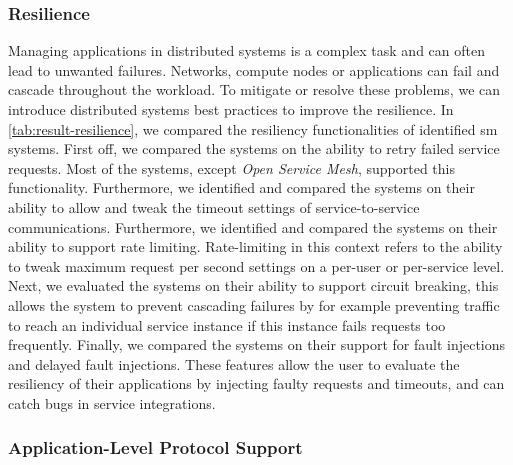 \subsubsection{Resilience}
\label{sec:survey:results:comparison:resilience}




Managing applications in distributed systems is a complex task and can often lead to unwanted failures. Networks, compute nodes or applications can fail and cascade throughout the workload. To mitigate or resolve these problems, we can introduce distributed systems best practices to improve the resilience. In \cref{tab:result-resilience}, we compared the resiliency functionalities of identified \gls{sm} systems. First off, we compared the systems on the ability to retry failed service requests. Most of the systems, except \textit{Open Service Mesh}, supported this functionality. Furthermore, we identified and compared the systems on their ability to allow and tweak the timeout settings of service-to-service communications. Furthermore, we identified and compared the systems on their ability to support rate limiting. Rate-limiting in this context refers to the ability to tweak maximum request per second settings on a per-user or per-service level. Next, we evaluated the systems on their ability to support circuit breaking, this allows the system to prevent cascading failures by for example preventing traffic to reach an individual service instance if this instance fails requests too frequently. Finally, we compared the systems on their support for fault injections and delayed fault injections. These features allow the user to evaluate the resiliency of their applications by injecting faulty requests and timeouts, and can catch bugs in service integrations.


\subsubsection{Application-Level Protocol Support}
\label{sec:survey:results:comparison:protocols}





